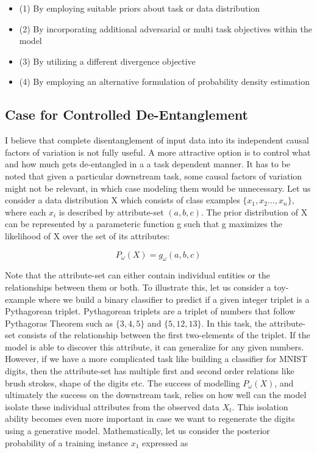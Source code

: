 \begin{itemize}
    \item (1) By employing suitable priors about task or data distribution
    \item (2) By incorporating additional adversarial or multi task objectives within the model
    \item (3) By utilizing a different divergence objective
    \item (4) By employing an alternative formulation of probability density estimation
\end{itemize}






\subsection{Case for Controlled De-Entanglement}

I believe that complete disentanglement of input data into its independent causal factors of variation is not fully useful. A more attractive option is to control what and how much gets de-entangled in a a task dependent manner. It has to be noted that given a particular downstream task, some causal factors of variation might not be relevant, in which case modeling them would be unnecessary. Let us consider a data distribution X which consists of class examples $\{ x_1, x_2...,x_n \}$, where each $x_i$ is described by attribute-set $(a,b,c)$. The prior distribution of X can be represented by a parameteric function g such that g maximizes the likelihood of X over the set of its attributes:

\begin{equation}
P_{\omega}(X) = g_{\omega}(a,b,c)
\end{equation}

Note that the attribute-set can either contain individual entities or the relationships between them or both.  To illustrate this, let us consider a toy-example where we build a binary classifier to predict if a given integer triplet is a Pythagorean triplet. Pythagorean triplets are a triplet of numbers that follow Pythagoras Theorem such as $\{3,4,5\}$ and $\{5,12,13 \}$. In this task, the attribute-set consists of the relationship between the first two-elements of the triplet. If the model is able to discover this attribute, it can generalize for any given numbers. %
However, if we have a more complicated task like building a classifier for MNIST digits, then the attribute-set has multiple first and second order relations like brush strokes, shape of the digits etc. The success of modelling $P_{\omega}(X)$, and ultimately the success on the downstream task, relies on how well can the model isolate these individual attributes from the observed data $X_{t}$. This isolation ability becomes even more important in case we want to regenerate the digits using a generative model. Mathematically, let us consider the posterior probability of a training instance $x_1$ expressed as 



